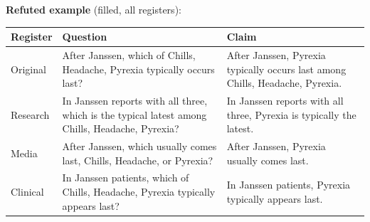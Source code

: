\documentclass[11pt]{article}
\begin{document}
\vspace{3pt}
\textbf{Refuted example} (filled, all registers): \\
\begin{tabularx}{\linewidth}{@{}l L L@{}}
\toprule
\textbf{Register} & \textbf{Question} & \textbf{Claim} \\
\midrule
Original & After Janssen, which of Chills, Headache, Pyrexia typically occurs last? & After Janssen, Pyrexia typically occurs last among Chills, Headache, Pyrexia. \\
Research & In Janssen reports with all three, which is the typical latest among Chills, Headache, Pyrexia? & In Janssen reports with all three, Pyrexia is typically the latest. \\
Media & After Janssen, which usually comes last, Chills, Headache, or Pyrexia? & After Janssen, Pyrexia usually comes last. \\
Clinical & In Janssen patients, which of Chills, Headache, Pyrexia typically appears last? & In Janssen patients, Pyrexia typically appears last. \\
\bottomrule
\end{tabularx}
\vspace{3pt}
\end{document}
